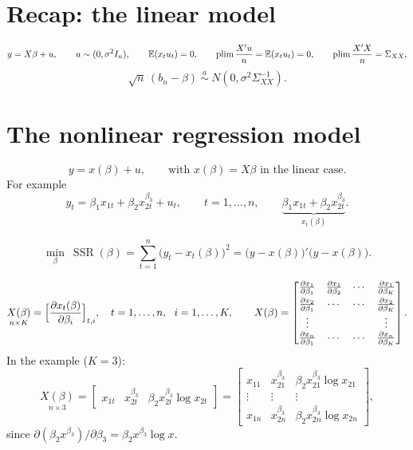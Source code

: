 \documentclass[11pt]{article}
\begin{document}

\section{Recap: the linear model}

\[ y = X\beta + u, \qquad u \sim (0, \sigma^{2}I_{n}), \qquad
   \mathbb{E}(x_{t}u_{t}) = 0, \qquad
   \operatorname*{plim}\frac{X'u}{n} = \mathbb{E}(x_{t}u_{t}) = 0, \qquad
   \operatorname*{plim}\frac{X'X}{n} = \Sigma_{XX}, \]
\[ \sqrt{n}\,(b_{n} - \beta) \ \overset{a}{\sim}\ N(0, \sigma^{2}\Sigma_{XX}^{-1}). \]


\section{The nonlinear regression model}

\[ y = x(\beta) + u, \qquad \text{with } x(\beta) = X\beta \text{ in the linear case.} \]
For example
\[ y_{t} = \beta_{1}x_{1t} + \beta_{2}x_{2t}^{\beta_{3}} + u_{t}, \qquad t = 1, \dots, n, \qquad
   \underbrace{\beta_{1}x_{1t} + \beta_{2}x_{2t}^{\beta_{3}}}_{x_{t}(\beta)}. \]

\[ \min_{\beta}\ \operatorname{SSR}(\beta) = \sum_{t=1}^{n}\bigl(y_{t} - x_{t}(\beta)\bigr)^{2}
   = \bigl(y - x(\beta)\bigr)'\bigl(y - x(\beta)\bigr). \]

\[ \underset{n\times K}{X(\beta)} = \Bigl[\frac{\partial x_{t}(\beta)}{\partial \beta_{i}}\Bigr]_{t,i},
   \quad t = 1, \dots, n, \ \ i = 1, \dots, K, \qquad
   X(\beta) = \begin{bmatrix}
       \frac{\partial x_{1}}{\partial \beta_{1}} & \frac{\partial x_{1}}{\partial \beta_{2}} & \cdots & \frac{\partial x_{1}}{\partial \beta_{K}}\\[4pt]
       \frac{\partial x_{2}}{\partial \beta_{1}} & \cdots & \cdots & \frac{\partial x_{2}}{\partial \beta_{K}}\\
       \vdots & & & \vdots\\
       \frac{\partial x_{n}}{\partial \beta_{1}} & \cdots & \cdots & \frac{\partial x_{n}}{\partial \beta_{K}}
     \end{bmatrix}. \]
In the example ($K = 3$):
\[ \underset{n\times 3}{X(\beta)}
   = \begin{bmatrix} x_{1t} & x_{2t}^{\beta_{3}} & \beta_{2}x_{2t}^{\beta_{3}}\log x_{2t} \end{bmatrix}
   = \begin{bmatrix}
       x_{11} & x_{21}^{\beta_{3}} & \beta_{2}x_{21}^{\beta_{3}}\log x_{21}\\
       \vdots & \vdots & \vdots\\
       x_{1n} & x_{2n}^{\beta_{3}} & \beta_{2}x_{2n}^{\beta_{3}}\log x_{2n}
     \end{bmatrix}, \]
since $\partial(\beta_{2}x^{\beta_{3}})/\partial\beta_{3} = \beta_{2}x^{\beta_{3}}\log x$.
\end{document}
